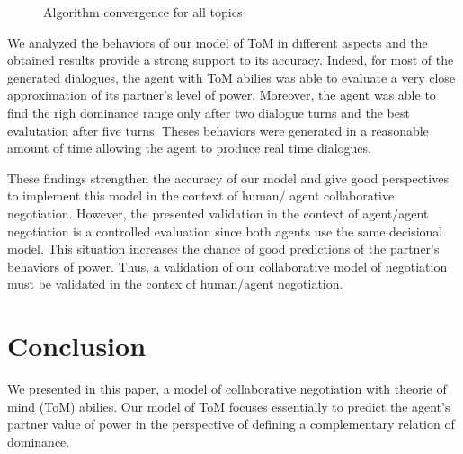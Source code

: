 \documentclass[sigconf]{aamas}  %
\begin{document}
	\begin{figure}[]
		\caption{Algorithm convergence for all topics} 
		\label{fig:time}
	\end{figure}

	We analyzed the behaviors of our model of ToM in different aspects and the obtained results provide a strong support to its accuracy. Indeed, for most of the generated dialogues, the agent with ToM abilies was able to evaluate a very close approximation of its partner's level of power. Moreover, the agent was able to find the righ dominance range only after two dialogue turns and the best evalutation after five turns. Theses behaviors were generated in a reasonable amount of time allowing the agent to produce real time dialogues.
	
	 These findings strengthen the accuracy of our model and give good perspectives to implement this model in the context of human/ agent collaborative negotiation. However, the presented validation in the context of agent/agent negotiation is a controlled evaluation since both agents use the same decisional model. This situation increases the chance of good predictions of the partner's behaviors of power. 	Thus, a validation of our collaborative model of negotiation must be validated in the contex of human/agent negotiation.
	\section{Conclusion}
		We presented in this paper, a model of collaborative negotiation with theorie of mind (ToM) abilies. Our model of ToM focuses essentially to predict the agent's partner value of power in the perspective of defining a complementary relation of dominance.
\end{document}
